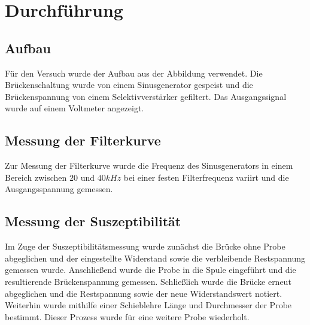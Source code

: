 \section{Durchführung}
\subsection{Aufbau}
Für den Versuch wurde der Aufbau aus der Abbildung verwendet. Die Brückenschaltung wurde von einem Sinusgenerator gespeist und die Brückenspannung von einem Selektivverstärker gefiltert. Das Ausgangssignal wurde auf einem Voltmeter angezeigt.
\subsection{Messung der Filterkurve}
Zur Messung der Filterkurve wurde die Frequenz des Sinusgenerators in einem Bereich zwischen $20$ und $40 kHz$ bei einer festen Filterfrequenz variirt und die Ausgangsspannung gemessen.
\subsection{Messung der Suszeptibilität}
Im Zuge der Suszeptibilitätsmessung wurde zunächst die Brücke ohne Probe abgeglichen und der eingestellte Widerstand
sowie die verbleibende Restspannung gemessen wurde. Anschließend wurde die Probe in die Spule eingeführt und die resultierende Brückenspannung gemessen. Schließlich wurde die Brücke erneut abgeglichen und die Restspannung sowie der neue Widerstandswert notiert. Weiterhin wurde mithilfe einer Schieblehre Länge und Durchmesser der Probe bestimmt. Dieser Prozess wurde für eine weitere Probe wiederholt.

